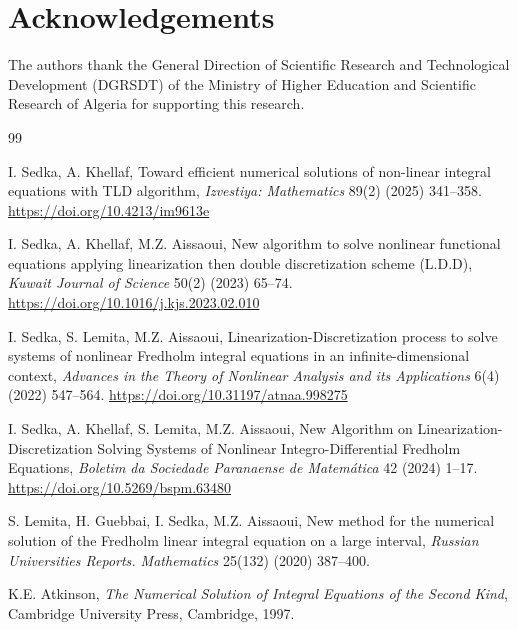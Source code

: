 \documentclass[12pt, a4paper]{article}
\begin{document}
\section*{Acknowledgements}

The authors thank the General Direction of Scientific
Research and Technological Development (DGRSDT) of the
Ministry of Higher Education and Scientific Research of
Algeria for supporting this research.



\begin{thebibliography}{99}

I. Sedka, A. Khellaf,
Toward efficient numerical solutions of non-linear integral
equations with TLD algorithm,
\textit{Izvestiya: Mathematics} 89(2) (2025) 341--358.
\url{https://doi.org/10.4213/im9613e}

I. Sedka, A. Khellaf, M.Z. Aissaoui,
New algorithm to solve nonlinear functional equations
applying linearization then double discretization scheme
(L.D.D),
\textit{Kuwait Journal of Science} 50(2) (2023) 65--74.
\url{https://doi.org/10.1016/j.kjs.2023.02.010}

I. Sedka, S. Lemita, M.Z. Aissaoui,
Linearization-Discretization process to solve systems of
nonlinear Fredholm integral equations in an
infinite-dimensional context,
\textit{Advances in the Theory of Nonlinear Analysis and
its Applications} 6(4) (2022) 547--564.
\url{https://doi.org/10.31197/atnaa.998275}

I. Sedka, A. Khellaf, S. Lemita, M.Z. Aissaoui,
New Algorithm on Linearization-Discretization Solving
Systems of Nonlinear Integro-Differential Fredholm
Equations,
\textit{Boletim da Sociedade Paranaense de Matem\'{a}tica}
42 (2024) 1--17.
\url{https://doi.org/10.5269/bspm.63480}

S. Lemita, H. Guebbai, I. Sedka, M.Z. Aissaoui,
New method for the numerical solution of the Fredholm
linear integral equation on a large interval,
\textit{Russian Universities Reports. Mathematics}
25(132) (2020) 387--400.

K.E. Atkinson,
\textit{The Numerical Solution of Integral Equations of
the Second Kind},
Cambridge University Press, Cambridge, 1997.


\end{thebibliography}
\end{document}
